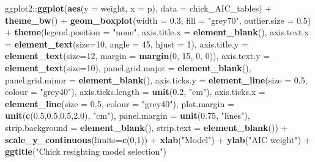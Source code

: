 \documentclass[]{article}
\newenvironment{Shaded}{\begin{snugshade}}{\end{snugshade}}
\newcommand{\KeywordTok}[1]{\textcolor[rgb]{0.13,0.29,0.53}{\textbf{{#1}}}}
\newcommand{\DataTypeTok}[1]{\textcolor[rgb]{0.13,0.29,0.53}{{#1}}}
\newcommand{\DecValTok}[1]{\textcolor[rgb]{0.00,0.00,0.81}{{#1}}}
\newcommand{\FloatTok}[1]{\textcolor[rgb]{0.00,0.00,0.81}{{#1}}}
\newcommand{\StringTok}[1]{\textcolor[rgb]{0.31,0.60,0.02}{{#1}}}
\newcommand{\NormalTok}[1]{{#1}}
\begin{document}
\begin{Shaded}
\begin{Highlighting}[]
\NormalTok{ggplot2::}\KeywordTok{ggplot}\NormalTok{(}\KeywordTok{aes}\NormalTok{(}\DataTypeTok{y =} \NormalTok{weight, }\DataTypeTok{x =} \NormalTok{p), }\DataTypeTok{data =} \NormalTok{chick_AIC_tables) +}\StringTok{ }
\StringTok{          }\KeywordTok{theme_bw}\NormalTok{() +}
\StringTok{          }\KeywordTok{geom_boxplot}\NormalTok{(}\DataTypeTok{width =} \FloatTok{0.3}\NormalTok{, }\DataTypeTok{fill =} \StringTok{"grey70"}\NormalTok{, }\DataTypeTok{outlier.size =} \FloatTok{0.5}\NormalTok{) +}
\StringTok{          }\KeywordTok{theme}\NormalTok{(}\DataTypeTok{legend.position =} \StringTok{"none"}\NormalTok{,}
                \DataTypeTok{axis.title.x =} \KeywordTok{element_blank}\NormalTok{(),}
                \DataTypeTok{axis.text.x  =} \KeywordTok{element_text}\NormalTok{(}\DataTypeTok{size=}\DecValTok{10}\NormalTok{, }\DataTypeTok{angle =} \DecValTok{45}\NormalTok{, }\DataTypeTok{hjust =} \DecValTok{1}\NormalTok{), }
                \DataTypeTok{axis.title.y =} \KeywordTok{element_text}\NormalTok{(}\DataTypeTok{size=}\DecValTok{12}\NormalTok{, }\DataTypeTok{margin =} \KeywordTok{margin}\NormalTok{(}\DecValTok{0}\NormalTok{, }\DecValTok{15}\NormalTok{, }\DecValTok{0}\NormalTok{, }\DecValTok{0}\NormalTok{)),}
                \DataTypeTok{axis.text.y  =} \KeywordTok{element_text}\NormalTok{(}\DataTypeTok{size=}\DecValTok{10}\NormalTok{),}
                \DataTypeTok{panel.grid.major =} \KeywordTok{element_blank}\NormalTok{(),}
                \DataTypeTok{panel.grid.minor =} \KeywordTok{element_blank}\NormalTok{(),}
                \DataTypeTok{axis.ticks.y =} \KeywordTok{element_line}\NormalTok{(}\DataTypeTok{size =} \FloatTok{0.5}\NormalTok{, }\DataTypeTok{colour =} \StringTok{"grey40"}\NormalTok{),}
                \DataTypeTok{axis.ticks.length =} \KeywordTok{unit}\NormalTok{(}\FloatTok{0.2}\NormalTok{, }\StringTok{"cm"}\NormalTok{),}
                \DataTypeTok{axis.ticks.x =} \KeywordTok{element_line}\NormalTok{(}\DataTypeTok{size =} \FloatTok{0.5}\NormalTok{, }\DataTypeTok{colour =} \StringTok{"grey40"}\NormalTok{),}
                \DataTypeTok{plot.margin =} \KeywordTok{unit}\NormalTok{(}\KeywordTok{c}\NormalTok{(}\FloatTok{0.5}\NormalTok{,}\FloatTok{0.5}\NormalTok{,}\FloatTok{0.5}\NormalTok{,}\FloatTok{2.0}\NormalTok{), }\StringTok{"cm"}\NormalTok{),}
                \DataTypeTok{panel.margin =} \KeywordTok{unit}\NormalTok{(}\FloatTok{0.75}\NormalTok{, }\StringTok{"lines"}\NormalTok{),}
                \DataTypeTok{strip.background =} \KeywordTok{element_blank}\NormalTok{(), }
                \DataTypeTok{strip.text =} \KeywordTok{element_blank}\NormalTok{()) +}
\StringTok{          }\KeywordTok{scale_y_continuous}\NormalTok{(}\DataTypeTok{limits=}\KeywordTok{c}\NormalTok{(}\DecValTok{0}\NormalTok{,}\DecValTok{1}\NormalTok{)) +}
\StringTok{          }\KeywordTok{xlab}\NormalTok{(}\StringTok{"Model"}\NormalTok{) +}\StringTok{ }
\StringTok{          }\KeywordTok{ylab}\NormalTok{(}\StringTok{"AIC weight"}\NormalTok{) +}
\StringTok{          }\KeywordTok{ggtitle}\NormalTok{(}\StringTok{"Chick resighting model selection"}\NormalTok{)}
\end{Highlighting}
\end{Shaded}
\end{document}
